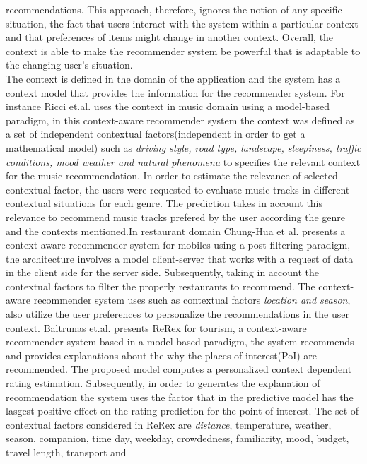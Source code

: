 recommendations. This approach, therefore, ignores the notion of any
specific situation, the fact that users interact with the system
within a particular context and  that preferences of items might 
change in another context.  
Overall, the context is able to make the recommender system be 
powerful that is adaptable to the changing user's situation.\\
The context is defined in the domain of the application and the system
has a context model that provides the information for the recommender
system. For instance Ricci et.al. \cite{baltrunas2011incarmusic} uses
the context in music domain using a model-based paradigm, in this
context-aware recommender system the context was defined as a set of
independent contextual factors(independent in order to get a
mathematical model) such as \textit{driving style, road type,
landscape, sleepiness, traffic conditions, mood weather and natural
phenomena} to specifies the relevant context for the music
recommendation. In order to estimate the relevance of selected
contextual factor, the users were requested to evaluate music tracks
in different contextual situations for each genre. The prediction
takes in account this relevance to recommend music tracks prefered by
the user according the genre and the contexts mentioned.In
restaurant domain Chung-Hua et al.\cite{chu2013chinese} presents a
context-aware recommender system for mobiles using a post-filtering
paradigm, the architecture involves a model client-server that works
with a request of data in the client side for the server side.
Subsequently, taking in account the contextual factors to filter the
properly restaurants to recommend. The context-aware recommender
system uses such as contextual factors \textit{location and season}, 
also utilize the user preferences to personalize the recommendations
in the user context.
Baltrunas et.al.\cite{baltrunas2011context} presents ReRex for tourism, 
a context-aware recommender system based in a model-based paradigm, the system
recommends and provides explanations about the why the places of
interest(PoI) are recommended. The proposed model computes a
personalized context dependent rating estimation. Subsequently, in
order to generates the explanation of recommendation the system uses
the factor that in the predictive model has the lasgest positive
effect on the rating prediction for the point of interest. The set of
contextual factors considered in ReRex are \textit{distance},
temperature, weather, season, companion, time day, weekday,
crowdedness, familiarity, mood, budget, travel length, transport and
